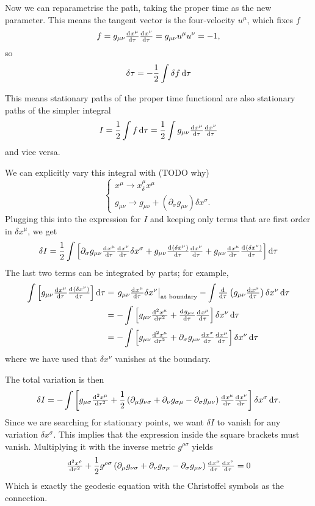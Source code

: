 Now we can reparametrise the path, taking the proper time as the new parameter. This means the tangent vector is the four-velocity $u^\mu$, which fixes $f$
\[ f = g_{\mu\nu} \od{x^\mu}{\tau}\od{x^\nu}{\tau} = g_{\mu\nu}u^\mu u^\nu = -1, \]
so
\[ \delta \tau = - \frac{1}{2}\int\delta f \operatorname{d \!}{\tau} \]

This means stationary paths of the proper time functional are also stationary paths of the simpler integral
\[ I = \frac{1}{2}\int f \diff{\tau} = \frac{1}{2}\int g_{\mu\nu} \od{x^\mu}{\tau}\od{x^\nu}{\tau} \]
and vice versa.

We can explicitly vary this integral with (TODO why)
\[ \begin{cases}
x^\mu \to x^\mu _ \delta x^\mu \\
g_{\mu\nu} \to g_{\mu\nu} + (\partial_\sigma g_{\mu\nu})\delta x^\sigma.
\end{cases} \]
Plugging this into the expression for $I$ and keeping only terms that are first order in $\delta x^\mu$, we get
\[ \delta I = \frac{1}{2}\int \left[\partial_\sigma g_{\mu\nu}\od{x^\mu}{\tau}\od{x^\nu}{\tau}\delta x^\sigma + g_{\mu\nu}\od{(\delta x^\mu)}{\tau}\od{x^\nu}{\tau} +g_{\mu\nu}\od{x^\mu}{\tau}\od{(\delta x^\nu)}{\tau}\right]\diff{\tau} \]
The last two terms can be integrated by parts; for example,
\begin{align}
\int \left[ g_{\mu\nu}\od{x^\mu}{\tau}\od{(\delta x^\nu)}{\tau} \right]\diff{\tau} &= \left. g_{\mu\nu}\od{x^\mu}{\tau}\delta x^\nu \right|_\text{at boundary} - \int \od{}{\tau}\left(g_{\mu\nu}\od{x^\mu}{\tau}\right)\delta x^\nu \diff{\tau} \\
&= - \int \left[g_{\mu\nu} \od[2]{x^\mu}{\tau} + \od{g_{\mu\nu}}{\tau}\od{x^\mu}{\tau}\right]\delta x^\nu \diff{\tau} \\
&= - \int \left[g_{\mu\nu} \od[2]{x^\mu}{\tau} + \partial_\sigma g_{\mu\nu}\od{x^\sigma}{\tau}\od{x^\mu}{\tau}\right]\delta x^\nu \diff{\tau}
\end{align}
where we have used that $\delta x^\nu$ vanishes at the boundary.

The total variation is then
\[ \delta I = - \int \left[g_{\mu\sigma}\od[2]{x^\mu}{\tau} + \frac{1}{2}\left(\partial_\mu g_{\nu\sigma} + \partial_\nu g_{\sigma\mu} - \partial_\sigma g_{\mu\nu}\right)\od{x^\mu}{\tau}\od{x^\nu}{\tau}\right]\delta x^\sigma \diff{\tau}. \]
Since we are searching for stationary points, we want $\delta I$ to vanish for any variation $\delta x^\sigma$. This implies that the expression inside the square brackets must vanish. Multiplying it with the inverse metric $g^{\rho\sigma}$ yields
\[ \od[2]{x^\rho}{\tau} + \frac{1}{2}g^{\rho\sigma}\left(\partial_\mu g_{\nu\sigma} + \partial_\nu g_{\sigma\mu} - \partial_\sigma g_{\mu\nu}\right)\od{x^\mu}{\tau}\od{x^\nu}{\tau} = 0 \]
Which is exactly the geodesic equation with the Christoffel symbols as the connection.

